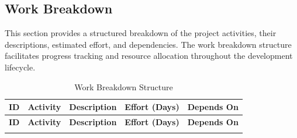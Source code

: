 \documentclass[12pt,a4paper]{report}
\begin{document}
\subsection{Work Breakdown}

This section provides a structured breakdown of the project activities, their descriptions, estimated effort, and dependencies. The work breakdown structure facilitates progress tracking and resource allocation throughout the development lifecycle.

\small
\renewcommand{\arraystretch}{1.3}
\begin{longtable}{|p{0.6cm}|p{2.6cm}|p{5.8cm}|p{1.4cm}|p{1.8cm}|}
\caption{Work Breakdown Structure} \label{tab:wbs} \\
\hline
\textbf{ID} & \textbf{Activity} & \textbf{Description} & \textbf{Effort (Days)} & \textbf{Depends On} \\
\hline
\endfirsthead
\hline
\textbf{ID} & \textbf{Activity} & \textbf{Description} & \textbf{Effort (Days)} & \textbf{Depends On} \\
\hline
\endhead
\hline
\endfoot


\end{longtable}
\end{document}
